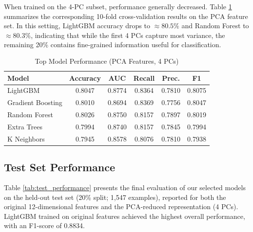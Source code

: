 When trained on the 4-PC subset, performance generally decreased. Table \ref{tab:model_comparison_pca} summarizes the corresponding 10-fold cross-validation results on the PCA feature set. In this setting, LightGBM accuracy drops to $\approx 80.5\%$ and Random Forest to $\approx 80.3\%$, indicating that while the first 4 PCs capture most variance, the remaining 20\% contains fine-grained information useful for classification.

\begin{table}[htbp]
\caption{Top Model Performance (PCA Features, 4 PCs)}
\begin{center}
\begin{tabular}{lccccc}
\hline
\textbf{Model} & \textbf{Accuracy} & \textbf{AUC} & \textbf{Recall} & \textbf{Prec.} & \textbf{F1} \\
\hline
LightGBM & 0.8047 & 0.8774 & 0.8364 & 0.7810 & 0.8075 \\
Gradient Boosting & 0.8010 & 0.8694 & 0.8369 & 0.7756 & 0.8047 \\
Random Forest & 0.8026 & 0.8750 & 0.8157 & 0.7897 & 0.8019 \\
Extra Trees & 0.7994 & 0.8740 & 0.8157 & 0.7845 & 0.7994 \\
K Neighbors & 0.7945 & 0.8578 & 0.8076 & 0.7810 & 0.7938 \\
\hline
\end{tabular}
\end{center}
\label{tab:model_comparison_pca}
\end{table}

\subsection{Test Set Performance}
Table \ref{tab:test_performance} presents the final evaluation of our selected models on the held-out test set (20\% split; 1,547 examples), reported for both the original 12-dimensional features and the PCA-reduced representation (4 PCs). LightGBM trained on original features achieved the highest overall performance, with an F1-score of 0.8834.

